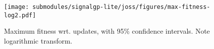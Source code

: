 \begin{figure}[h]

\centering
\texttt{[image: submodules/signalgp-lite/joss/figures/max-fitness-log2.pdf]}

\caption{%
Maximum fitness wrt. updates, with 95\% confidence intervals.
Note logarithmic transform.
} \label{fig:max-fitness-sd}

\end{figure}
